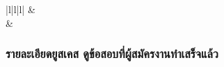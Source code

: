 \begin{table}[H]
\begin{tabular}{|l|l|l|}
  \hline
                       & \\[-\rowheight]
  \printcelltop                                     & \\
  \hline
  \end{tabular}
  \caption{รายละเอียดยูสเคส หมดเวลาทำข้อสอบ}
  \label{Table:examTimeOver}
\end{table}

\subsubsection{รายละเอียดยูสเคส ดูข้อสอบที่ผู้สมัครงานทำเสร็จแล้ว}

